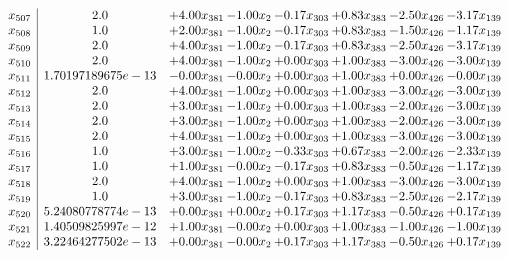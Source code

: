 \documentclass[8pt]{article}
\begin{document}
\[\begin{array}{c| c c@{\hskip 2pt} c@{\hskip 2pt} c@{\hskip 2pt} c@{\hskip 2pt} c@{\hskip 2pt} c@{\hskip 2pt} }
 x_{507}   &  2.0 & +  4.00 x_{381} & -1.00 x_{2} & -0.17 x_{303} & +  0.83 x_{383} & -2.50 x_{426} & -3.17 x_{139}\\
 x_{508}   &  1.0 & +  2.00 x_{381} & -1.00 x_{2} & -0.17 x_{303} & +  0.83 x_{383} & -1.50 x_{426} & -1.17 x_{139}\\
 x_{509}   &  2.0 & +  4.00 x_{381} & -1.00 x_{2} & -0.17 x_{303} & +  0.83 x_{383} & -2.50 x_{426} & -3.17 x_{139}\\
 x_{510}   &  2.0 & +  4.00 x_{381} & -1.00 x_{2} & +  0.00 x_{303} & +  1.00 x_{383} & -3.00 x_{426} & -3.00 x_{139}\\
 x_{511}   &  1.70197189675e-13 & -0.00 x_{381} & -0.00 x_{2} & +  0.00 x_{303} & +  1.00 x_{383} & +  0.00 x_{426} & -0.00 x_{139}\\
 x_{512}   &  2.0 & +  4.00 x_{381} & -1.00 x_{2} & +  0.00 x_{303} & +  1.00 x_{383} & -3.00 x_{426} & -3.00 x_{139}\\
 x_{513}   &  2.0 & +  3.00 x_{381} & -1.00 x_{2} & +  0.00 x_{303} & +  1.00 x_{383} & -2.00 x_{426} & -3.00 x_{139}\\
 x_{514}   &  2.0 & +  3.00 x_{381} & -1.00 x_{2} & +  0.00 x_{303} & +  1.00 x_{383} & -2.00 x_{426} & -3.00 x_{139}\\
 x_{515}   &  2.0 & +  4.00 x_{381} & -1.00 x_{2} & +  0.00 x_{303} & +  1.00 x_{383} & -3.00 x_{426} & -3.00 x_{139}\\
 x_{516}   &  1.0 & +  3.00 x_{381} & -1.00 x_{2} & -0.33 x_{303} & +  0.67 x_{383} & -2.00 x_{426} & -2.33 x_{139}\\
 x_{517}   &  1.0 & +  1.00 x_{381} & -0.00 x_{2} & -0.17 x_{303} & +  0.83 x_{383} & -0.50 x_{426} & -1.17 x_{139}\\
 x_{518}   &  2.0 & +  4.00 x_{381} & -1.00 x_{2} & +  0.00 x_{303} & +  1.00 x_{383} & -3.00 x_{426} & -3.00 x_{139}\\
 x_{519}   &  1.0 & +  3.00 x_{381} & -1.00 x_{2} & -0.17 x_{303} & +  0.83 x_{383} & -2.50 x_{426} & -2.17 x_{139}\\
 x_{520}   &  5.24080778774e-13 & +  0.00 x_{381} & +  0.00 x_{2} & +  0.17 x_{303} & +  1.17 x_{383} & -0.50 x_{426} & +  0.17 x_{139}\\
 x_{521}   &  1.40509825997e-12 & +  1.00 x_{381} & -0.00 x_{2} & +  0.00 x_{303} & +  1.00 x_{383} & -1.00 x_{426} & -1.00 x_{139}\\
 x_{522}   &  3.22464277502e-13 & +  0.00 x_{381} & -0.00 x_{2} & +  0.17 x_{303} & +  1.17 x_{383} & -0.50 x_{426} & +  0.17 x_{139}\\

\end{array}\]
\end{document}

